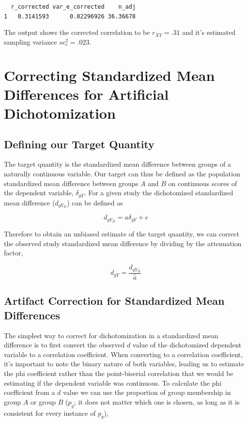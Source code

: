 \documentclass[
  letterpaper,
  DIV=11,
  numbers=noendperiod]{scrreprt}
\begin{document}
\begin{verbatim}
  r_corrected var_e_corrected    n_adj
1   0.3141593      0.02296926 36.36678
\end{verbatim}

The output shows the corrected correlation to be \(r_{XY}=.31\) and it's
estimated sampling variance \(se_c^2=.023\).

\section{Correcting Standardized Mean Differences for Artificial
Dichotomization}\label{correcting-standardized-mean-differences-for-artificial-dichotomization}

\subsection{Defining our Target
Quantity}\label{defining-our-target-quantity-1}

The target quantity is the standardized mean difference between groups
of a naturally continuous variable. Our target can thus be defined as
the population standardized mean difference between groups \(A\) and
\(B\) on continuous scores of the dependent variable, \(\delta_{gY}\).
For a given study the dichotomized standardized mean difference
(\(d_{gY_D}\)) can be defined as

\[
d_{gY_D} = a\delta_{gY} + e
\]

Therefore to obtain an unbiased estimate of the target quantity, we can
correct the observed study standardized mean difference by dividing by
the attenuation factor,

\[
d_{gY} = \frac{d_{gY_D}}{\hat{a}}
\]

\subsection{Artifact Correction for Standardized Mean
Differences}\label{sec-corr-smd}

The simplest way to correct for dichotomization in a standardized mean
difference is to first convert the observed \(d\) value of the
dichotomized dependent variable to a correlation coefficient. When
converting to a correlation coefficient, it's important to note the
binary nature of both variables, leading us to estimate the phi
coefficient rather than the point-biserial correlation that we would be
estimating if the dependent variable was continuous. To calculate the
phi coefficient from a \(d\) value we can use the proportion of group
membership in group \(A\) or group \(B\) (\(p_g\); it does not matter
which one is chosen, as long as it is consistent for every instance of
\(p_g\)),
\end{document}
